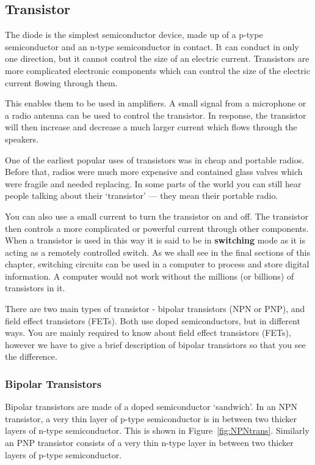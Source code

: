\subsection{Transistor}
The diode is the simplest semiconductor device, made up of a p-type semiconductor and an n-type semiconductor in contact. It can conduct in only one direction, but it cannot control the size of an electric current.  Transistors are more complicated electronic components which can control the size of the electric current flowing through them.  

This enables them to be used in amplifiers.  A small signal from a microphone or a radio antenna can be used to control the transistor.  In response, the transistor will then increase and decrease a much larger current which flows through the speakers.

\begin{IFact}{One of the earliest popular uses of transistors was in cheap and portable radios.  Before that, radios were much more expensive and contained glass valves which were fragile and needed replacing.  In some parts of the world you can still hear people talking about their `transistor' --- they mean their portable radio.}\end{IFact}

You can also use a small current to turn the transistor on and off.  The transistor then controls a more complicated or powerful current through other components.  When a transistor is used in this way it is said to be in {\bf switching} mode as it is acting as a remotely controlled switch.  As we shall see in the final sections of this chapter, switching circuits can be used in a computer to process and store digital information.  A computer would not work without the millions (or billions) of transistors in it.

There are two main types of transistor - bipolar transistors (NPN or PNP), and field effect transistors (FETs).  Both use doped semiconductors, but in different ways.  You are mainly required to know about field effect transistors (FETs), however we have to give a brief description of bipolar transistors so that you see the difference.

\subsubsection{Bipolar Transistors}

Bipolar transistors are made of a doped semiconductor `sandwich'.  In an NPN transistor, a very thin layer of p-type semiconductor is in between two thicker layers of n-type semiconductor.  This is shown in Figure~\ref{fig:NPNtrans}.  Similarly an PNP transistor consists of a very thin n-type layer in between two thicker layers of p-type semiconductor.

